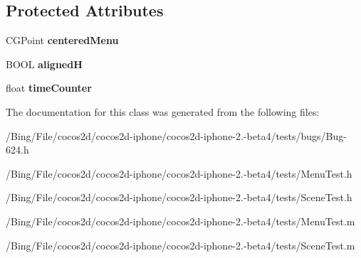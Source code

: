\subsection*{Protected Attributes}
\begin{DoxyCompactItemize}
\item 
\hypertarget{interface_layer2_a7b5d1449cd141c140ea063b1fbd9bdc1}{C\-G\-Point {\bfseries centered\-Menu}}\label{interface_layer2_a7b5d1449cd141c140ea063b1fbd9bdc1}

\item 
\hypertarget{interface_layer2_ad34db347a0d1f5a220d112e452f231f3}{B\-O\-O\-L {\bfseries aligned\-H}}\label{interface_layer2_ad34db347a0d1f5a220d112e452f231f3}

\item 
\hypertarget{interface_layer2_a42f1421d77486623f56aba558b4452f6}{float {\bfseries time\-Counter}}\label{interface_layer2_a42f1421d77486623f56aba558b4452f6}

\end{DoxyCompactItemize}


The documentation for this class was generated from the following files\-:\begin{DoxyCompactItemize}
\item 
/\-Bing/\-File/cocos2d/cocos2d-\/iphone/cocos2d-\/iphone-\/2.-\/beta4/tests/bugs/Bug-\/624.\-h\item 
/\-Bing/\-File/cocos2d/cocos2d-\/iphone/cocos2d-\/iphone-\/2.-\/beta4/tests/Menu\-Test.\-h\item 
/\-Bing/\-File/cocos2d/cocos2d-\/iphone/cocos2d-\/iphone-\/2.-\/beta4/tests/Scene\-Test.\-h\item 
/\-Bing/\-File/cocos2d/cocos2d-\/iphone/cocos2d-\/iphone-\/2.-\/beta4/tests/Menu\-Test.\-m\item 
/\-Bing/\-File/cocos2d/cocos2d-\/iphone/cocos2d-\/iphone-\/2.-\/beta4/tests/Scene\-Test.\-m\end{DoxyCompactItemize}
